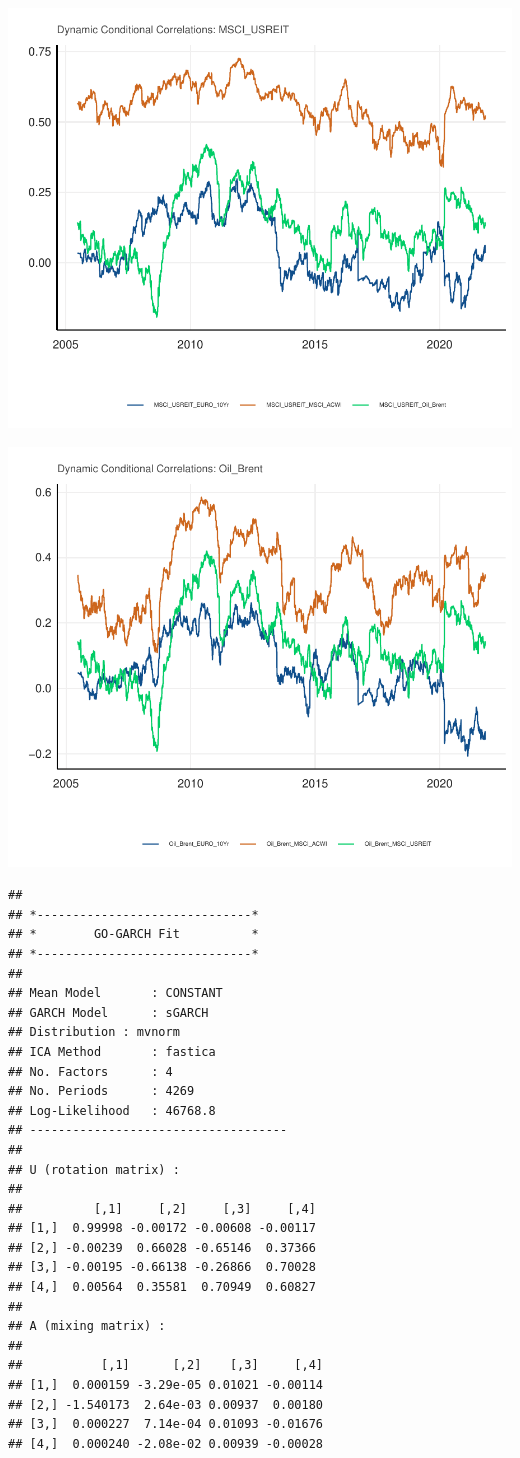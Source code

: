 \documentclass[11pt,preprint, authoryear]{elsarticle}
\numberwithin{equation}{section}
\numberwithin{figure}{section}
\numberwithin{table}{section}
\begin{document}
\includegraphics{Question6_files/figure-latex/unnamed-chunk-9-1.pdf}

\includegraphics{Question6_files/figure-latex/unnamed-chunk-10-1.pdf}

\begin{verbatim}
## 
## *------------------------------*
## *        GO-GARCH Fit          *
## *------------------------------*
## 
## Mean Model       : CONSTANT
## GARCH Model      : sGARCH
## Distribution : mvnorm
## ICA Method       : fastica
## No. Factors      : 4
## No. Periods      : 4269
## Log-Likelihood   : 46768.8
## ------------------------------------
## 
## U (rotation matrix) : 
## 
##          [,1]     [,2]     [,3]     [,4]
## [1,]  0.99998 -0.00172 -0.00608 -0.00117
## [2,] -0.00239  0.66028 -0.65146  0.37366
## [3,] -0.00195 -0.66138 -0.26866  0.70028
## [4,]  0.00564  0.35581  0.70949  0.60827
## 
## A (mixing matrix) : 
## 
##           [,1]      [,2]    [,3]     [,4]
## [1,]  0.000159 -3.29e-05 0.01021 -0.00114
## [2,] -1.540173  2.64e-03 0.00937  0.00180
## [3,]  0.000227  7.14e-04 0.01093 -0.01676
## [4,]  0.000240 -2.08e-02 0.00939 -0.00028
\end{verbatim}
\end{document}
